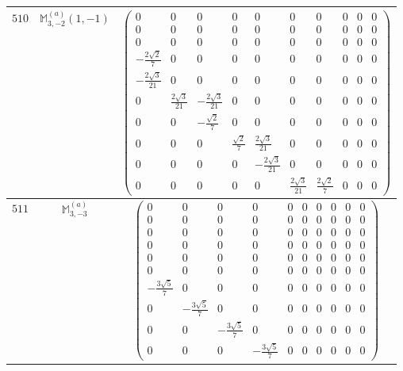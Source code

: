 \documentclass[fleqn,8pt,landscape]{jsarticle}
\begin{document}
\begin{center}
\begin{longtable}{ccc}
$ 510 $ & $ \mathbb{M}_{3,-2}^{(a)}(1,-1) $ & $ \begin{pmatrix} 0 & 0 & 0 & 0 & 0 & 0 & 0 & 0 & 0 & 0 \\ 0 & 0 & 0 & 0 & 0 & 0 & 0 & 0 & 0 & 0 \\ 0 & 0 & 0 & 0 & 0 & 0 & 0 & 0 & 0 & 0 \\ - \frac{2 \sqrt{2}}{7} & 0 & 0 & 0 & 0 & 0 & 0 & 0 & 0 & 0 \\ - \frac{2 \sqrt{3}}{21} & 0 & 0 & 0 & 0 & 0 & 0 & 0 & 0 & 0 \\ 0 & \frac{2 \sqrt{3}}{21} & - \frac{2 \sqrt{3}}{21} & 0 & 0 & 0 & 0 & 0 & 0 & 0 \\ 0 & 0 & - \frac{\sqrt{2}}{7} & 0 & 0 & 0 & 0 & 0 & 0 & 0 \\ 0 & 0 & 0 & \frac{\sqrt{2}}{7} & \frac{2 \sqrt{3}}{21} & 0 & 0 & 0 & 0 & 0 \\ 0 & 0 & 0 & 0 & - \frac{2 \sqrt{3}}{21} & 0 & 0 & 0 & 0 & 0 \\ 0 & 0 & 0 & 0 & 0 & \frac{2 \sqrt{3}}{21} & \frac{2 \sqrt{2}}{7} & 0 & 0 & 0 \end{pmatrix} $ \\ \hline
$ 511 $ & $ \mathbb{M}_{3,-3}^{(a)} $ & $ \begin{pmatrix} 0 & 0 & 0 & 0 & 0 & 0 & 0 & 0 & 0 & 0 \\ 0 & 0 & 0 & 0 & 0 & 0 & 0 & 0 & 0 & 0 \\ 0 & 0 & 0 & 0 & 0 & 0 & 0 & 0 & 0 & 0 \\ 0 & 0 & 0 & 0 & 0 & 0 & 0 & 0 & 0 & 0 \\ 0 & 0 & 0 & 0 & 0 & 0 & 0 & 0 & 0 & 0 \\ 0 & 0 & 0 & 0 & 0 & 0 & 0 & 0 & 0 & 0 \\ - \frac{3 \sqrt{5}}{7} & 0 & 0 & 0 & 0 & 0 & 0 & 0 & 0 & 0 \\ 0 & - \frac{3 \sqrt{5}}{7} & 0 & 0 & 0 & 0 & 0 & 0 & 0 & 0 \\ 0 & 0 & - \frac{3 \sqrt{5}}{7} & 0 & 0 & 0 & 0 & 0 & 0 & 0 \\ 0 & 0 & 0 & - \frac{3 \sqrt{5}}{7} & 0 & 0 & 0 & 0 & 0 & 0 \end{pmatrix} $ \\ \hline

\end{longtable}
\end{center}
\end{document}

